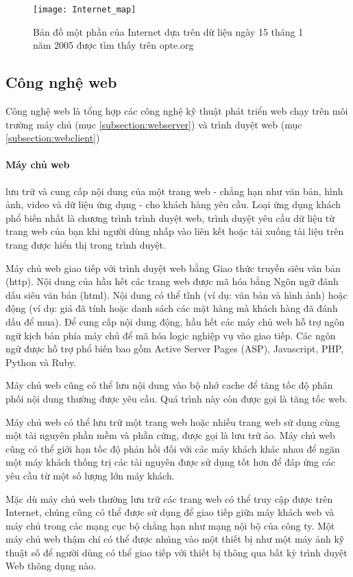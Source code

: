 \begin{figure}[h!]
	\caption{Bản đồ một phần của Internet dựa trên dữ liệu ngày 15 tháng 1 năm 2005 được tìm thấy trên opte.org}
	\centering
	\texttt{[image: Internet\_map]}
	\label{fig:ill:internet}
\end{figure}

\subsection{Công nghệ web}

Công nghệ web là tổng hợp các công nghệ kỹ thuật phát triển web chạy trên môi trường máy chủ (mục \ref{subsection:webserver}) và trình duyệt web (mục \ref{subsection:webclient})

\paragraph{Máy chủ web \cite{web:server:what}} lưu trữ và cung cấp nội dung của một trang web - chẳng hạn như văn bản, hình ảnh, video và dữ liệu ứng dụng - cho khách hàng yêu cầu. Loại ứng dụng khách phổ biến nhất là chương trình trình duyệt web, trình duyệt yêu cầu dữ liệu từ trang web của bạn khi người dùng nhấp vào liên kết hoặc tải xuống tài liệu trên trang được hiển thị trong trình duyệt.

Máy chủ web giao tiếp với trình duyệt web bằng Giao thức truyền siêu văn bản (\acrshort{http}). Nội dung của hầu hết các trang web được mã hóa bằng Ngôn ngữ đánh dấu siêu văn bản (\acrshort{html}). Nội dung có thể tĩnh (ví dụ: văn bản và hình ảnh) hoặc động (ví dụ: giá đã tính hoặc danh sách các mặt hàng mà khách hàng đã đánh dấu để mua). Để cung cấp nội dung động, hầu hết các máy chủ web hỗ trợ ngôn ngữ kịch bản phía máy chủ để mã hóa logic nghiệp vụ vào giao tiếp. Các ngôn ngữ được hỗ trợ phổ biến bao gồm Active Server Pages (ASP), Javascript, PHP, Python và Ruby.

Máy chủ web cũng có thể lưu nội dung vào bộ nhớ cache để tăng tốc độ phân phối nội dung thường được yêu cầu. Quá trình này còn được gọi là tăng tốc web.

Máy chủ web có thể lưu trữ một trang web hoặc nhiều trang web sử dụng cùng một tài nguyên phần mềm và phần cứng, được gọi là lưu trữ ảo. Máy chủ web cũng có thể giới hạn tốc độ phản hồi đối với các máy khách khác nhau để ngăn một máy khách thống trị các tài nguyên được sử dụng tốt hơn để đáp ứng các yêu cầu từ một số lượng lớn máy khách.

Mặc dù máy chủ web thường lưu trữ các trang web có thể truy cập được trên Internet, chúng cũng có thể được sử dụng để giao tiếp giữa máy khách web và máy chủ trong các mạng cục bộ chẳng hạn như mạng nội bộ của công ty. Một máy chủ web thậm chí có thể được nhúng vào một thiết bị như một máy ảnh kỹ thuật số để người dùng có thể giao tiếp với thiết bị thông qua bất kỳ trình duyệt Web thông dụng nào.

